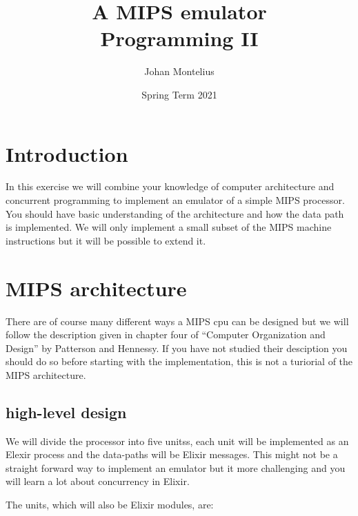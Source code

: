 \documentclass[a4paper,11pt]{article}
\begin{document}
\title{
    \textbf{A MIPS emulator}\\
    \large{Programming II}
}
\author{Johan Montelius}
\date{Spring Term 2021}
\maketitle
{}

\section*{Introduction}

In this exercise we will combine your knowledge of computer
architecture and concurrent programming to implement an emulator of a
simple MIPS processor. You should have basic understanding of the
architecture and how the data path is implemented. We will only
implement a small subset of the MIPS machine instructions but it will
be possible to extend it.

\section{MIPS architecture}

There are of course many different ways a MIPS cpu can be designed but
we will follow the description given in chapter four of ``Computer Organization and
Design'' by Patterson and Hennessy. If you have not studied their
desciption you should do so before starting with the implementation,
this is not a turiorial of the MIPS architecture.

\subsection*{high-level design}

We will divide the processor into five unitss, each unit will be
implemented as an Elexir process and the data-paths will be Elixir
messages. This might not be a straight forward way to implement an
emulator but it more challenging and you will learn a lot about
concurrency in Elixir.

The units, which will also be Elixir modules, are:
\end{document}
